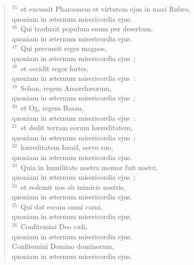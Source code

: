 \begin{flushleft}
\begin{verse}
${}^{15}$~et excussit Pharaonem et virtutem ejus in mari Rubro,\\ quoniam in \ae ternum misericordia ejus.\\
${}^{16}$~Qui traduxit populum suum per desertum,\\ quoniam in \ae ternum misericordia ejus.\\
${}^{17}$~Qui percussit reges magnos,\\ quoniam in \ae ternum misericordia ejus~;\\
${}^{18}$~et occidit reges fortes,\\ quoniam in \ae ternum misericordia ejus~:\\
${}^{19}$~Sehon, regem Amorrh\ae orum,\\ quoniam in \ae ternum misericordia ejus~;\\
${}^{20}$~et Og, regem Basan,\\ quoniam in \ae ternum misericordia ejus~:\\
${}^{21}$~et dedit terram eorum h\ae reditatem,\\ quoniam in \ae ternum misericordia ejus~;\\
${}^{22}$~h\ae reditatem Isra\"el, servo suo,\\ quoniam in \ae ternum misericordia ejus.\\
${}^{23}$~Quia in humilitate nostra memor fuit nostri,\\ quoniam in \ae ternum misericordia ejus~;\\
${}^{24}$~et redemit nos ab inimicis nostris,\\ quoniam in \ae ternum misericordia ejus.\\
${}^{25}$~Qui dat escam omni carni,\\ quoniam in \ae ternum misericordia ejus.\\
${}^{26}$~Confitemini Deo c\ae li,\\ quoniam in \ae ternum misericordia ejus.\\ Confitemini Domino dominorum,\\ quoniam in \ae ternum misericordia ejus.\end{verse}\end{flushleft}



